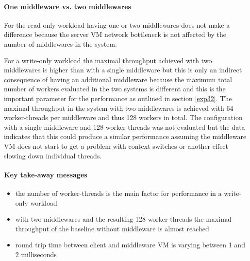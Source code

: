 \documentclass[report.tex]{subfiles}
\begin{document}
\paragraph{One middleware vs. two middlewares}

For the read-only workload having one or two middlewares does not make a difference because the server VM network bottleneck is not affected by the number of middlewares in the system.

For a write-only workload the maximal throughput achieved with two middlewares is higher than with a single middleware but  this is only an indirect consequence of having an additional middleware because the maximum total number of workers evaluated in the two systems is different and this is the important parameter for the performance as outlined in section \ref{exp32}. The maximal throughput in the system with two middlewares is achieved with 64 worker-threads per middleware and thus 128 workers in total. The configuration with a single middleware and 128 worker-threads was not evaluated but the data indicates that this could produce a similar performance assuming the middleware VM does not start to get a problem with context switches or another effect slowing down individual threads.

\paragraph{Key take-away messages}
\begin{itemize}
	\vitemsep
	\item the number of worker-threads is the main factor for performance in a write-only workload
	\item with two middlewares and the resulting 128 worker-threads the maximal throughput of the baseline without middleware is almost reached
	\item round trip time between client and middleware VM is varying between 1 and 2 milliseconds
\end{itemize}
\end{document}
